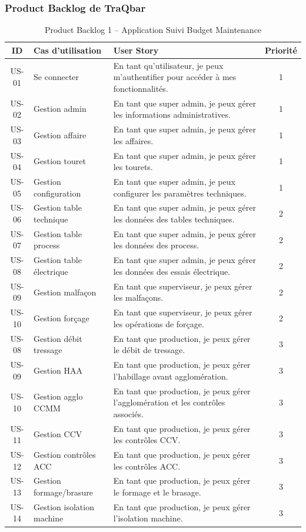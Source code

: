 \documentclass[11pt,a4paper]{article}
\begin{document}
\subsubsection*{Product Backlog de TraQbar}
\begin{table}[H]
\centering
\begin{tabular}{|c|p{5cm}|p{7cm}|c|}
\hline
\textbf{ID} & \textbf{Cas d’utilisation} & \textbf{User Story} & \textbf{Priorité} \\
\hline
US-01 & Se connecter & En tant qu’utilisateur, je peux m’authentifier pour accéder à mes fonctionnalités. & 1 \\
\hline
US-02 & Gestion admin & En tant que super admin, je peux gérer les informations administratives. & 1 \\
\hline
US-03 & Gestion affaire & En tant que super admin, je peux gérer les affaires. & 1 \\
\hline
US-04 & Gestion touret & En tant que super admin, je peux gérer les tourets. & 1 \\
\hline
US-05 & Gestion configuration & En tant que super admin, je peux configurer les paramètres techniques. & 1 \\
\hline
US-06 & Gestion table technique & En tant que super admin, je peux gérer les données des tables techniques. & 2 \\
\hline
US-07 & Gestion table process & En tant que super admin, je peux gérer les données des process. & 2 \\\hline
US-08 & Gestion table électrique & En tant que super admin, je peux gérer les données des essais électrique. & 2 \\
\hline
US-09 & Gestion malfaçon & En tant que superviseur, je peux gérer les malfaçons. & 2 \\
\hline
US-10 & Gestion forçage & En tant que superviseur, je peux gérer les opérations de forçage. & 2 \\

\hline
US-08 & Gestion débit tressage & En tant que production, je peux gérer le débit de tressage. & 3 \\
\hline
US-09 & Gestion HAA & En tant que production, je peux gérer l'habillage avant agglomération. & 3 \\
\hline
US-10 & Gestion agglo CCMM & En tant que production, je peux gérer l’agglomération et les contrôles associés. & 3 \\
\hline
US-11 & Gestion CCV & En tant que production, je peux gérer les contrôles CCV. & 3 \\
\hline
US-12 & Gestion contrôles ACC & En tant que production, je peux gérer les contrôles ACC. & 3 \\
\hline
US-13 & Gestion formage/brasure & En tant que production, je peux gérer le formage et le brasage. & 3 \\
\hline
US-14 & Gestion isolation machine & En tant que production, je peux gérer l’isolation machine. & 3 \\
\hline
\end{tabular}
\caption{Product Backlog  1 – Application Suivi Budget Maintenance }
\end{table}
\end{document}
